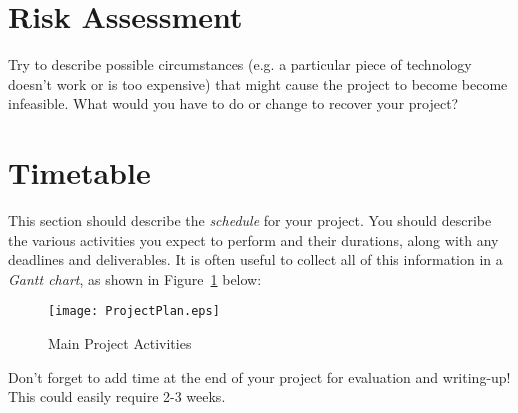 \documentclass[a4paper,12pt]{article}
\begin{document}
\section*{Risk Assessment}

Try to describe possible circumstances (e.g. a particular piece of
technology doesn't work or is too expensive) that might cause
the project to become become infeasible. What would you have to do
or change to recover your project?

\section*{Timetable}

This section should describe the {\em schedule} for your project. 
You should describe the various activities you expect to perform
and their durations, along with any deadlines and deliverables.
It is often useful to collect all of this information in a
{\em Gantt chart}, as shown in Figure~\ref{fig:plan} below:

\begin{figure}[htb]
\begin{center}
\texttt{[image: ProjectPlan.eps]}
\caption{Main Project Activities\label{fig:plan}}
\end{center}
\end{figure}


Don't forget to add time at the end of your project for 
evaluation and writing-up! This could easily require 2-3 weeks.



\end{document}
